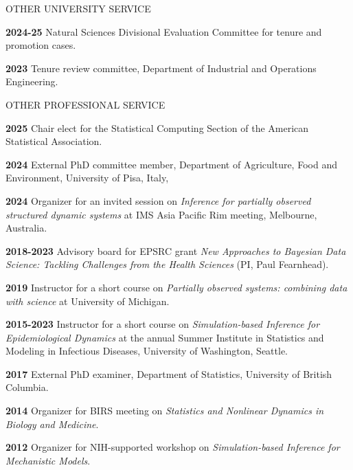 \lsp

\begin{mylist}{OTHER UNIVERSITY SERVICE}
\item{\bf 2024-25 } Natural Sciences Divisional Evaluation Committee for tenure and promotion cases.
\item{\bf 2023 } Tenure review committee, Department of Industrial and Operations Engineering.
\end{mylist}

\begin{mylist}{OTHER PROFESSIONAL SERVICE}

\item{\bf 2025 } Chair elect for the Statistical Computing Section of the American Statistical Association.
  
\item{\bf 2024 } External PhD committee member, Department of Agriculture, Food and Environment, University of Pisa, Italy,
  
\item{\bf 2024 } Organizer for an invited session on {\it Inference for partially observed structured dynamic systems} at IMS Asia Pacific Rim meeting, Melbourne, Australia.
   
\item{\bf 2018-2023 } Advisory board for EPSRC grant {\it New Approaches to Bayesian Data Science: Tackling Challenges from the Health Sciences}  (PI, Paul Fearnhead).

\item{\bf 2019 } Instructor for a short course on {\it Partially observed systems: combining data with science} at University of Michigan.

\item{\bf 2015-2023 } Instructor for a short course on {\it Simulation-based Inference for Epidemiological Dynamics} at the annual Summer Institute in Statistics and Modeling in Infectious Diseases, University of Washington, Seattle.

\item{\bf 2017 } External PhD examiner, Department of Statistics, University of British Columbia.

\item{\bf 2014 } Organizer for BIRS meeting on {\it Statistics and Nonlinear Dynamics in Biology and Medicine}.

\item{\bf 2012 } Organizer for NIH-supported workshop on {\it Simulation-based Inference for Mechanistic Models}.


\end{mylist}

